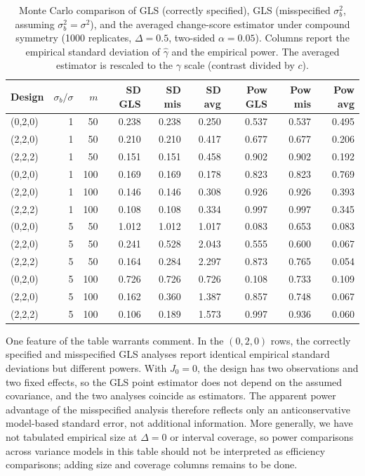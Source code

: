 \documentclass[
  11pt,
]{article}
\begin{document}
\begin{table}

\caption{\label{tab:simulation-study}Monte Carlo comparison of GLS (correctly specified), GLS (misspecified $\sigma_b^2$, assuming $\sigma_b^2=\sigma^2$), and the averaged change-score estimator under compound symmetry (1000 replicates, $\Delta=0.5$, two-sided $\alpha=0.05$). Columns report the empirical standard deviation of $\hat\gamma$ and the empirical power. The averaged estimator is rescaled to the $\gamma$ scale (contrast divided by $c$).}
\centering
\begin{tabular}[t]{lrrrrrrrr}
\toprule
Design & $\sigma_b/\sigma$ & $m$ & SD GLS & SD mis & SD avg & Pow GLS & Pow mis & Pow avg\\
\midrule
(0,2,0) & 1 & 50 & 0.238 & 0.238 & 0.250 & 0.537 & 0.537 & 0.495\\
(2,2,0) & 1 & 50 & 0.210 & 0.210 & 0.417 & 0.677 & 0.677 & 0.206\\
(2,2,2) & 1 & 50 & 0.151 & 0.151 & 0.458 & 0.902 & 0.902 & 0.192\\
(0,2,0) & 1 & 100 & 0.169 & 0.169 & 0.178 & 0.823 & 0.823 & 0.769\\
(2,2,0) & 1 & 100 & 0.146 & 0.146 & 0.308 & 0.926 & 0.926 & 0.393\\
\addlinespace
(2,2,2) & 1 & 100 & 0.108 & 0.108 & 0.334 & 0.997 & 0.997 & 0.345\\
(0,2,0) & 5 & 50 & 1.012 & 1.012 & 1.017 & 0.083 & 0.653 & 0.083\\
(2,2,0) & 5 & 50 & 0.241 & 0.528 & 2.043 & 0.555 & 0.600 & 0.067\\
(2,2,2) & 5 & 50 & 0.164 & 0.284 & 2.297 & 0.873 & 0.765 & 0.054\\
(0,2,0) & 5 & 100 & 0.726 & 0.726 & 0.726 & 0.108 & 0.733 & 0.109\\
\addlinespace
(2,2,0) & 5 & 100 & 0.162 & 0.360 & 1.387 & 0.857 & 0.748 & 0.067\\
(2,2,2) & 5 & 100 & 0.106 & 0.189 & 1.573 & 0.997 & 0.936 & 0.060\\
\bottomrule
\end{tabular}
\end{table}

One feature of the table warrants comment. In the
\((0,2,0)\) rows, the correctly specified and misspecified
GLS analyses report identical empirical standard
deviations but different powers. With \(J_0 = 0\), the
design has two observations and two fixed effects, so
the GLS point estimator does not depend on the assumed
covariance, and the two analyses coincide as estimators.
The apparent power advantage of the misspecified
analysis therefore reflects only an anticonservative
model-based standard error, not additional information.
More generally, we have not tabulated empirical size at
\(\Delta = 0\) or interval coverage, so power comparisons
across variance models in this table should not be
interpreted as efficiency comparisons; adding size and
coverage columns remains to be done.
\end{document}
